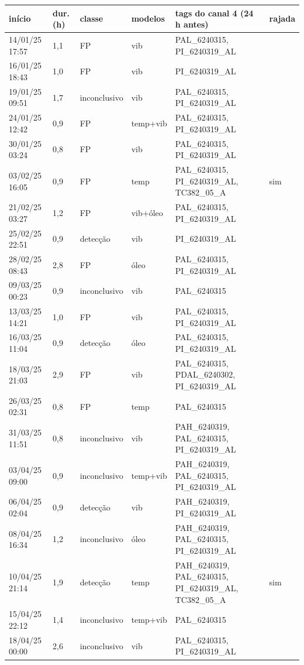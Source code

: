 \begin{longtable}{llll >{\raggedright\arraybackslash}p{6.2cm} l}
\toprule
início & dur. (h) & classe & modelos & tags do canal 4 (24 h antes) & rajada \\
\midrule
\endhead
14/01/25 17:57 & 1,1 & FP & vib & PAL\_6240315, PI\_6240319\_AL &  \\
16/01/25 18:43 & 1,0 & FP & vib & PI\_6240319\_AL &  \\
19/01/25 09:51 & 1,7 & inconclusivo & vib & PAL\_6240315, PI\_6240319\_AL &  \\
24/01/25 12:42 & 0,9 & FP & temp+vib & PAL\_6240315, PI\_6240319\_AL &  \\
30/01/25 03:24 & 0,8 & FP & vib & PAL\_6240315, PI\_6240319\_AL &  \\
03/02/25 16:05 & 0,9 & FP & temp & PAL\_6240315, PI\_6240319\_AL, TC382\_05\_A & sim \\
21/02/25 03:27 & 1,2 & FP & vib+óleo & PAL\_6240315, PI\_6240319\_AL &  \\
25/02/25 22:51 & 0,9 & detecção & vib & PI\_6240319\_AL &  \\
28/02/25 08:43 & 2,8 & FP & óleo & PAL\_6240315, PI\_6240319\_AL &  \\
09/03/25 00:23 & 0,9 & inconclusivo & vib & PAL\_6240315 &  \\
13/03/25 14:21 & 1,0 & FP & vib & PAL\_6240315, PI\_6240319\_AL &  \\
16/03/25 11:04 & 0,9 & detecção & óleo & PAL\_6240315, PI\_6240319\_AL &  \\
18/03/25 21:03 & 2,9 & FP & vib & PAL\_6240315, PDAL\_6240302, PI\_6240319\_AL &  \\
26/03/25 02:31 & 0,8 & FP & temp & PAL\_6240315 &  \\
31/03/25 11:51 & 0,8 & inconclusivo & vib & PAH\_6240319, PAL\_6240315, PI\_6240319\_AL &  \\
03/04/25 09:00 & 0,9 & inconclusivo & temp+vib & PAH\_6240319, PAL\_6240315, PI\_6240319\_AL &  \\
06/04/25 02:04 & 0,9 & detecção & vib & PAH\_6240319, PI\_6240319\_AL &  \\
08/04/25 16:34 & 1,2 & inconclusivo & óleo & PAH\_6240319, PAL\_6240315, PI\_6240319\_AL &  \\
10/04/25 21:14 & 1,9 & detecção & temp & PAH\_6240319, PAL\_6240315, PI\_6240319\_AL, TC382\_05\_A & sim \\
15/04/25 22:12 & 1,4 & inconclusivo & temp+vib & PAL\_6240315 &  \\
18/04/25 00:00 & 2,6 & inconclusivo & vib & PAL\_6240315, PI\_6240319\_AL &  \\

\end{longtable}
